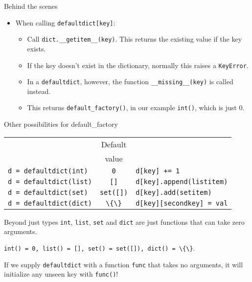 \documentclass{beamer}
\begin{document}
\begin{frame}{Behind the scenes}
\begin{itemize}

  \item When calling \lstinline$defaultdict[key]$:
    \begin{itemize}
      \item Call \lstinline$dict.__getitem__(key)$. This returns the existing value if the key exists.
      \item If the key doesn't exist in the dictionary, normally this raises a \lstinline$KeyError$.
      \item In a \lstinline$defaultdict$, however, the function \lstinline$__missing__(key)$ is called instead.
      \item This returns \lstinline$default_factory()$, in our example \lstinline$int()$, which is just 0.
    \end{itemize}
  
\end{itemize}

\end{frame}

\begin{frame}{Other possibilities for default\_factory}
 \begin{tabular}{lcl}
      & Default & \\
      & value   & \\
   \lstinline$d = defaultdict(int)$  & \lstinline$0$ & \lstinline$d[key] += 1$ \\
   \lstinline$d = defaultdict(list)$ & \lstinline$[]$ & \lstinline$d[key].append(listitem)$ \\
   \lstinline$d = defaultdict(set)$  & \lstinline$set([])$ & \lstinline$d[key].add(setitem)$ \\
   \lstinline$d = defaultdict(dict)$ & \lstinline$\{\}$ & \lstinline$d[key][secondkey] = val$ \\
 \end{tabular}
\end{frame}

\begin{frame}{Beyond just types}
 \lstinline$int$, \lstinline$list$, \lstinline$set$ and \lstinline$dict$ are just functions that can take zero arguments.

 \bigskip 
 
 \lstinline$int() = 0, list() = [], set() = set([]), dict() = \{\}$.

 \bigskip

 If we supply \lstinline$defaultdict$ with a function \lstinline$func$ that takes no arguments,
 it will initialize any unseen key with \lstinline$func()$!
\end{frame}
\end{document}
